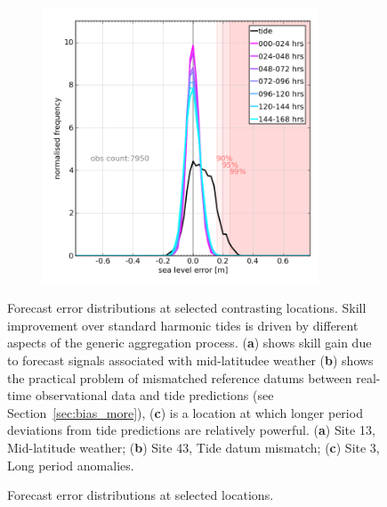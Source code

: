 \begin{figure}[H]
\begin{subfigure}{0.30\textwidth}
    \caption{}
    \end{subfigure}
    \begin{subfigure}{0.30\textwidth}
    \includegraphics[width=0.9\textwidth]{figures/plots/0003_verify_pdf.png}
    \caption{}
    \end{subfigure}
    \caption{Forecast error distributions at selected locations.}
    {Forecast error distributions at selected contrasting locations. Skill improvement over standard harmonic tides is driven by different aspects of the generic aggregation process. (\textbf{a}) shows skill gain due to forecast signals associated with mid-latitudee weather (\textbf{b}) shows the practical problem of mismatched reference datums between real-time observational data and tide predictions (see Section~\ref{sec:bias_more}), (\textbf{c}) is a location at which longer period deviations from tide predictions are relatively powerful. (\textbf{a}) Site 13, Mid-latitude weather; (\textbf{b}) Site 43, Tide datum mismatch; (\textbf{c}) Site 3, Long period anomalies.}

    \label{fig:pdf}
\end{figure}   


